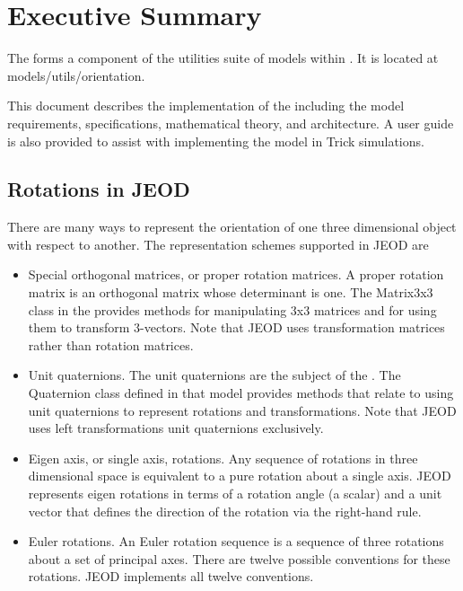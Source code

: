%
%
% 
%

\chapter*{Executive Summary}
The \ModelDesc forms a component of the utilities suite of models
within \JEODid. It is located at models/utils/orientation.

This document describes the implementation of the \ModelDesc including
the model requirements, specifications, mathematical theory,
and architecture.  A user guide is also provided to assist
with implementing the model in Trick simulations.

\section*{Rotations in JEOD}
There are many ways to represent the orientation of one three dimensional
object with respect to another. The representation schemes supported in JEOD are
\begin{itemize}
\item Special orthogonal matrices, or proper rotation matrices.
A proper rotation matrix is an orthogonal matrix whose determinant is one.
The Matrix3x3 class in the  provides methods for
manipulating 3x3 matrices and for using them to transform 3-vectors.
Note that JEOD uses transformation matrices rather than rotation matrices.
\item Unit quaternions.
The unit quaternions are the subject of the .
The Quaternion class defined in that model provides methods that relate to
using unit quaternions to represent rotations and transformations.
Note that JEOD uses left transformations unit quaternions exclusively.
\item Eigen axis, or single axis, rotations.
Any sequence of rotations in three dimensional space is equivalent to
a pure rotation about a single axis.
JEOD represents eigen rotations in terms of a rotation angle (a scalar) and a
unit vector that defines the direction of the rotation via the right-hand rule.
\item Euler rotations. An Euler rotation sequence is a sequence of three
rotations about a set of principal axes. There are twelve possible conventions
for these rotations. JEOD implements all twelve conventions.
\end{itemize}


